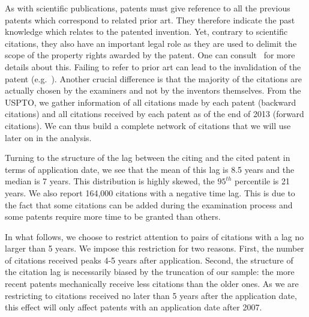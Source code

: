 As with scientific publications, patents must give reference to all the previous patents which correspond to related prior art. They therefore indicate the past knowledge which relates to the patented invention. Yet, contrary to scientific citations, they also have an important legal role as they are used to delimit the scope of the property rights awarded by the patent. One can consult~\cite{oecdpatentmanual} for more details about this. Failing to refer to prior art can lead to the invalidation of the patent (e.g.~\cite{martin2015}). Another crucial difference is that the majority of the citations are actually chosen by the  examiners and not by the inventors themselves. 
From the USPTO, we gather information of all citations made by each patent (backward citations) and all citations received by each patent as of the end of 2013 (forward citations). We can thus build a complete network of citations that we will use later on in the analysis.

Turning to the structure of the lag between the citing and the cited patent in terms of application date, we see that the mean of this lag is 8.5 years and the median is 7 years. This distribution is highly skewed, the $95^{th}$ percentile is 21 years. We also report 164,000 citations with a negative time lag. This is due to the fact that some citations can be added during the examination process and some patents require more time to be granted than others.

In what follows, we choose to restrict attention to pairs of citations with a lag no larger than 5 years. We impose this restriction for two reasons. First, the number of citations received peaks 4-5 years after application. Second, the structure of the citation lag is necessarily biased by the truncation of our sample: the more recent patents mechanically receive less citations than the older ones. As we are restricting to citations received no later than 5 years after the application date, this effect will only affect patents with an application date after 2007.

